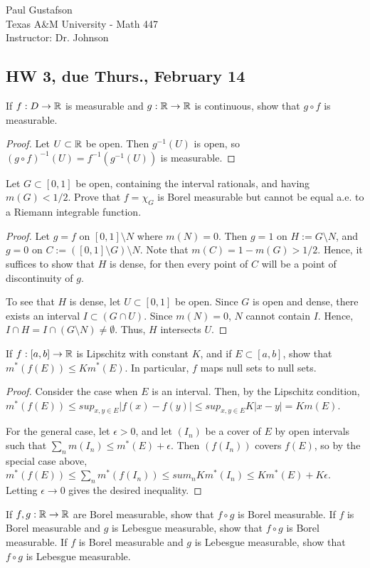 \documentclass{article}
\begin{document}
\noindent Paul Gustafson\\
\noindent Texas A\&M University - Math 447\\ 
\noindent Instructor: Dr. Johnson

\subsection*{HW 3, due Thurs., February 14}
 If $f: D\to \mathbb{R}$ is measurable and $g: \mathbb{R} \to \mathbb{R}$ is continuous, show that $g \circ f$ is measurable.
\begin{proof}
Let $U \subset \mathbb{R}$ be open.  Then $g^{-1}(U)$ is open, so $(g \circ f)^{-1}(U) = f^{-1}(g^{-1}(U))$ is measurable.
\end{proof}
 Let $G \subset [0,1]$ be open, containing the interval rationals, and having $m(G) < 1/2$. Prove that $f = \chi_G$ is Borel measurable but cannot be equal a.e. to a Riemann integrable function.
\begin{proof}
Let $g = f$ on $[0,1]\setminus N$ where $m(N) = 0$. Then $g = 1$ on $H:=G \setminus N$, and $g=0$ on $C:= ([0,1]\setminus G)\setminus N$. Note that $m(C) = 1 - m(G) > 1/2$. Hence, it suffices to show that $H$ is dense, for then every point of $C$ will be a point of discontinuity of $g$.

To see that $H$ is dense, let $U \subset [0,1]$ be open.  Since $G$ is open and dense, there exists an interval $I \subset (G \cap U)$. Since $m(N) = 0$, $N$ cannot contain $I$. Hence, $I \cap H = I \cap (G\setminus N) \ne \emptyset$. Thus, $H$ intersects $U$.
\end{proof}
 If $f : [a,b] \to \mathbb{R}$ is Lipschitz with constant $K$, and if $E \subset [a,b]$, show that $m^*(f(E)) \le K m^*(E)$. In particular, $f$ maps null sets to null sets.
\begin{proof}
Consider the case when $E$ is an interval. Then, by the Lipschitz condition, $m^*(f(E)) \le sup_{x,y \in E} |f(x) - f(y)| \le sup_{x,y \in E} K |x-y| = K m(E)$.

For the general case, let $\epsilon > 0$, and let $(I_n)$ be a cover of $E$ by open intervals such that $\sum_n m(I_n) \le m^*(E) + \epsilon$. Then $(f(I_n))$ covers $f(E)$, so by the special case above, $m^*(f(E)) \le \sum_n m^*(f(I_n)) \le sum_n K m^*(I_n) \le Km^*(E) + K\epsilon$.  Letting $\epsilon \to 0$ gives the desired inequality.
\end{proof}
 If $f,g: \mathbb{R} \to \mathbb{R}$ are Borel measurable, show that $f \circ g$ is Borel measurable. If $f$ is Borel measurable and $g$ is Lebesgue measurable, show that $f \circ g$ is Borel measurable.  If $f$ is Borel measurable and $g$ is Lebesgue measurable, show that $f \circ g$ is Lebesgue measurable.
\end{document}
